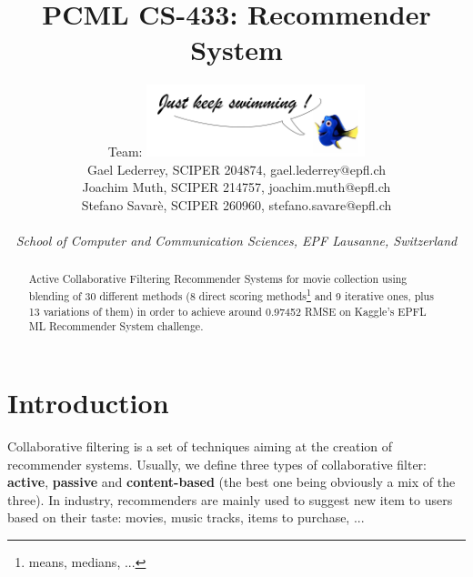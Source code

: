 \documentclass[10pt,conference,compsocconf]{IEEEtran}
\begin{document}

\title{PCML CS-433: Recommender System}

\author{
   \hspace{0.8cm} Team: {\includegraphics[width=2.5in ,valign=t, trim=0cm 0 0 3.8cm]{img/Dory.png}} \\

  Gael Lederrey, SCIPER 204874, gael.lederrey@epfl.ch \\
    Joachim Muth, SCIPER 214757, joachim.muth@epfl.ch\\
  Stefano Savar\`e, SCIPER 260960, stefano.savare@epfl.ch \\
 \\ 

  \textit{School of Computer and Communication Sciences, EPF Lausanne, Switzerland}
}

\maketitle

\begin{abstract}
Active Collaborative Filtering Recommender Systems for movie collection using blending of 30 different methods (8 direct scoring methods\footnote{means, medians, ...} and 9 iterative ones, plus 13 variations of them) in order to achieve around 0.97452
 RMSE on Kaggle's EPFL ML Recommender System challenge. 
\end{abstract}

\section{Introduction}

Collaborative filtering is a set of techniques aiming at the creation of recommender systems. Usually, we define three types of collaborative filter: \textbf{active}, \textbf{passive} and \textbf{content-based} (the best one being obviously a mix of the three). In industry, recommenders are mainly used to suggest new item to users based on their taste: movies, music tracks, items to purchase, ...
\end{document}
